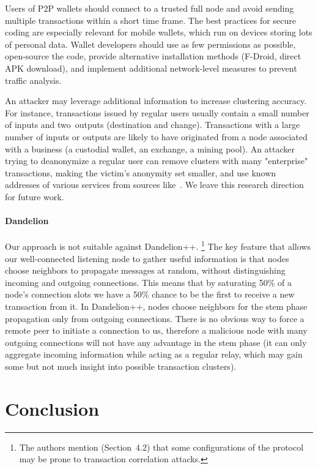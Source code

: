 Users of P2P wallets should connect to a trusted full node and avoid sending multiple transactions within a short time frame.
The best practices for secure coding are especially relevant for mobile wallets, which run on devices storing lots of personal data.
Wallet developers should use as few permissions as possible, open-source the code, provide alternative installation methods (F-Droid, direct APK download), and implement additional network-level measures to prevent traffic analysis.

An attacker may leverage additional information to increase clustering accuracy.
For instance, transactions issued by regular users usually contain a small number of inputs and two~outputs (destination and change).
Transactions with a large number of inputs or outputs are likely to have originated from a node associated with a business (a custodial wallet, an exchange, a mining pool).
An attacker trying to deanonymize a regular user can remove clusters with many "enterprise" transactions, making the victim's anonymity set smaller, and use known addresses of various services from sources like~\cite{Walletexplorer}.
We leave this research direction for future work.

\paragraph{Dandelion}

Our approach is not suitable against Dandelion++.
\footnote{The authors mention (Section~4.2) that some configurations of the protocol may be prone to transaction correlation attacks.}
The key feature that allows our well-connected listening node to gather useful information is that nodes choose neighbors to propagate messages at random, without distinguishing incoming and outgoing connections.
This means that by saturating 50\% of a node's connection slots we have a 50\% chance to be the first to receive a new transaction from it.
In Dandelion++, nodes choose neighbors for the stem phase propagation only from outgoing connections.
There is no obvious way to force a remote peer to initiate a connection to us, therefore a malicious node with many outgoing connections will not have any advantage in the stem phase (it can only aggregate incoming information while acting as a regular relay, which may gain some but not much insight into possible transaction clusters).


\section{Conclusion} \label{sec:Ch03Conclusion}

